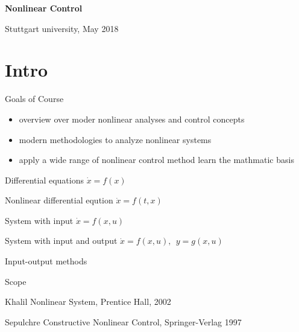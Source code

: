 \begin{center}
{\Huge\bf Nonlinear Control}

{Stuttgart university, May 2018}
\end{center}


\section*{Intro}

Goals of Course

\begin{itemize}
\item overview over moder nonlinear analyses and control concepts
\item modern methodologies to analyze nonlinear systems
\item apply a wide range of nonlinear control method
learn the mathmatic basis
\end{itemize}


Differential equations $\dot x = f(x)$

Nonlinear differential eqution $\dot x = f(t,x)$

System with input $\dot x = f(x,u)$

System with input and output $\dot x=f(x,u),\ \ y=g(x,u)$ 

Input-output methods


Scope 
\begin{enumerate}[label={[\arabic*]}]
  \item Khalil Nonlinear System, Prentice Hall, 2002
  \item Sepulchre Constructive Nonlinear Control, Springer-Verlag 1997 
\end{enumerate}

